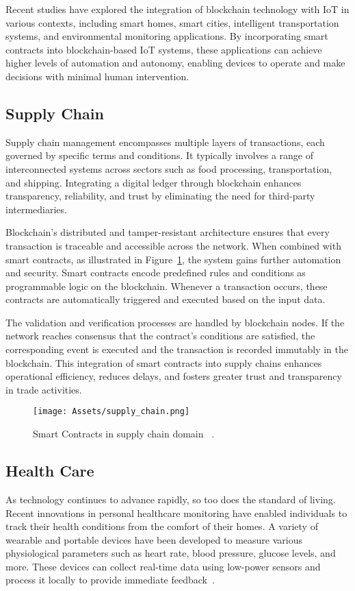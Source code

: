 Recent studies have explored the integration of blockchain technology with IoT in various contexts, including smart homes, smart cities, intelligent transportation systems, and environmental monitoring applications. By incorporating smart contracts into blockchain-based IoT systems, these applications can achieve higher levels of automation and autonomy, enabling devices to operate and make decisions with minimal human intervention.

\subsection{Supply Chain}
Supply chain management encompasses multiple layers of transactions, each governed by specific terms and conditions. It typically involves a range of interconnected systems across sectors such as food processing, transportation, and shipping. Integrating a digital ledger through blockchain enhances transparency, reliability, and trust by eliminating the need for third-party intermediaries.

Blockchain’s distributed and tamper-resistant architecture ensures that every transaction is traceable and accessible across the network. When combined with smart contracts, as illustrated in Figure~\ref{fig:supply_chain}, the system gains further automation and security. Smart contracts encode predefined rules and conditions as programmable logic on the blockchain. Whenever a transaction occurs, these contracts are automatically triggered and executed based on the input data.

The validation and verification processes are handled by blockchain nodes. If the network reaches consensus that the contract’s conditions are satisfied, the corresponding event is executed and the transaction is recorded immutably in the blockchain. This integration of smart contracts into supply chains enhances operational efficiency, reduces delays, and fosters greater trust and transparency in trade activities.
\begin{figure}[H]
    \centering
    \texttt{[image: Assets/supply\_chain.png]}
    \caption{Smart Contracts in supply chain domain ~\cite{feng2024interpretable}.}
    \label{fig:supply_chain}
\end{figure}

\subsection{Health Care}
As technology continues to advance rapidly, so too does the standard of living. Recent innovations in personal healthcare monitoring have enabled individuals to track their health conditions from the comfort of their homes. A variety of wearable and portable devices have been developed to measure various physiological parameters such as heart rate, blood pressure, glucose levels, and more. These devices can collect real-time data using low-power sensors and process it locally to provide immediate feedback~\cite{zhang2015iot}.

